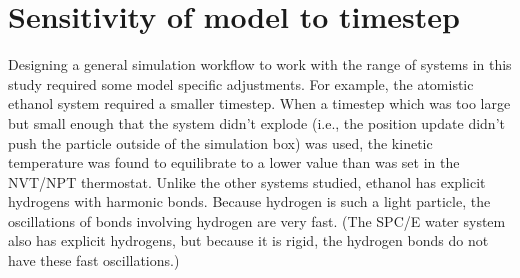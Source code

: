 \section{Sensitivity of model to timestep}

Designing a general simulation workflow to work with the range of systems in this study required some model specific adjustments.
For example, the atomistic ethanol system required a smaller timestep.
When a timestep which was too large but small enough that the system didn't explode (i.e., the position update didn't push the particle outside of the simulation box) was used, the kinetic temperature was found to equilibrate to a lower value than was set in the NVT/NPT thermostat.
Unlike the other systems studied, ethanol has explicit hydrogens with harmonic bonds. 
Because hydrogen is such a light particle, the oscillations of bonds involving hydrogen are very fast.
(The SPC/E water system also has explicit hydrogens, but because it is rigid, the hydrogen bonds do not have these fast oscillations.) 

